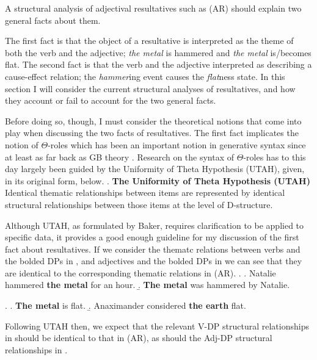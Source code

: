 \documentclass[MilwayThesis]{subfiles}
\begin{document}
A structural analysis of adjectival resultatives such as (AR) should explain two general facts about them.
\AREx{}

The first fact is that the object of a resultative is interpreted as the theme of both the verb and the adjective; \textit{the metal} is hammered and \textit{the metal} is/becomes flat.
The second fact is that the verb and the adjective interpreted as describing a cause-effect relation; the \textit{hammer}ing event causes the \textit{flat}ness state.
In this section I will consider the current structural analyses of resultatives, and how they account or fail to account for the two general facts.

Before doing so, though, I must consider the theoretical notions that come into play when discussing the two facts of resultatives.
The first fact implicates the notion of $\Theta$-roles which has been an important notion in generative syntax since at least as far back as GB theory \parencite{chomsky1981lectures}.
Research on the syntax of $\Theta$-roles has to this day largely been guided by the Uniformity of Theta Hypothesis (UTAH), given, in its original form, below.
\ex. \textbf{The Uniformity of Theta Hypothesis (UTAH)}\\
Identical thematic relationships between items are represented by identical structural relationships between those items at the level of D-structure. \parencite[46]{baker1988incorporation}

Although UTAH, as formulated by Baker, requires clarification to be applied to specific data, it provides a good enough guideline for my discussion of the first fact about resultatives.
If we consider the thematc relations between verbs and the bolded DPs in \Next, and adjectives and the bolded DPs in \NNext we can see that they are identical to the corresponding thematic relations in (AR).
\ex. 
\a. Natalie hammered \textbf{the metal} for an hour.
\b. \textbf{The metal} was hammered by Natalie.

\ex. 
\a. \textbf{The metal} is flat.
\b. Anaximander considered \textbf{the earth} flat.

Following UTAH then, we expect that the relevant V-DP structural relationships in \LLast should be identical to that in (AR), as should the Adj-DP structural relationships in \Last.
\end{document}
